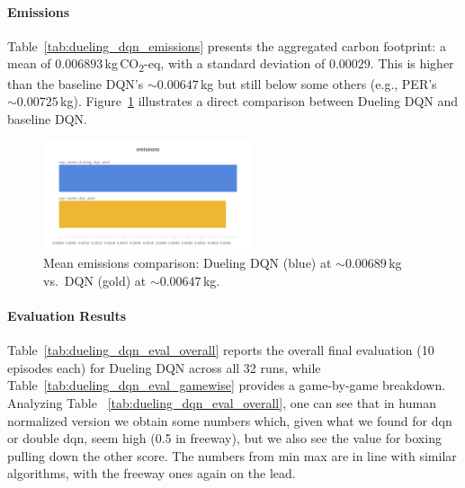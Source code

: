 \paragraph{Emissions}
Table~\ref{tab:dueling_dqn_emissions} presents the aggregated carbon footprint: 
a mean of $0.006893$\,kg\,CO\textsubscript{2}-eq, with a standard deviation of $0.00029$. 
This is higher than the baseline DQN’s $\sim0.00647$\,kg 
but still below some others (e.g., PER’s $\sim0.00725$\,kg). 
Figure~\ref{fig:dueling_emissions_barplot} illustrates a direct comparison 
between Dueling DQN and baseline DQN.

\begin{table}
	\caption{Carbon emissions (kg\,CO\textsubscript{2}eq) for Dueling DQN across 32 runs.}
	\label{tab:dueling_dqn_emissions}
	\centering
\end{table}

\begin{figure}
	\centering
	\includegraphics[width=0.55\textwidth]{figures/dueling_dqn/emissions_dqn_dueling.png}
	\caption{Mean emissions comparison: Dueling DQN (blue) at $\sim0.00689$\,kg vs.\ DQN (gold) at $\sim0.00647$\,kg.}
	\label{fig:dueling_emissions_barplot}
\end{figure}

\paragraph{Evaluation Results}
Table~\ref{tab:dueling_dqn_eval_overall} reports the overall final evaluation (10 episodes each) for Dueling DQN across all 32 runs, while Table~\ref{tab:dueling_dqn_eval_gamewise} provides a game-by-game breakdown.
Analyzing Table ~\ref{tab:dueling_dqn_eval_overall}, one can see that in human normalized version we obtain some numbers which, given what we found for dqn or double dqn, seem high (0.5 in freeway), but we also see the value for boxing pulling down the other score.
The numbers from min max are in line with similar algorithms, with the freeway ones again on the lead.

